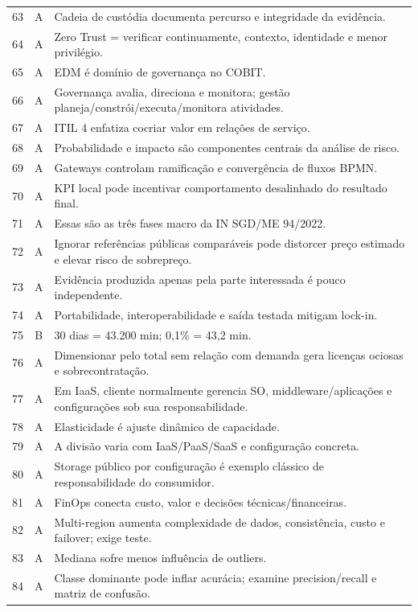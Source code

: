\begin{longtable}{c c p{10.8cm}}
63 & A & Cadeia de custódia documenta percurso e integridade da evidência. \\
64 & A & Zero Trust = verificar continuamente, contexto, identidade e menor privilégio. \\
65 & A & EDM é domínio de governança no COBIT. \\
66 & A & Governança avalia, direciona e monitora; gestão planeja/constrói/executa/monitora atividades. \\
67 & A & ITIL 4 enfatiza cocriar valor em relações de serviço. \\
68 & A & Probabilidade e impacto são componentes centrais da análise de risco. \\
69 & A & Gateways controlam ramificação e convergência de fluxos BPMN. \\
70 & A & KPI local pode incentivar comportamento desalinhado do resultado final. \\
71 & A & Essas são as três fases macro da IN SGD/ME 94/2022. \\
72 & A & Ignorar referências públicas comparáveis pode distorcer preço estimado e elevar risco de sobrepreço. \\
73 & A & Evidência produzida apenas pela parte interessada é pouco independente. \\
74 & A & Portabilidade, interoperabilidade e saída testada mitigam lock-in. \\
75 & B & 30 dias = 43.200 min; 0,1\% = 43,2 min. \\
76 & A & Dimensionar pelo total sem relação com demanda gera licenças ociosas e sobrecontratação. \\
77 & A & Em IaaS, cliente normalmente gerencia SO, middleware/aplicações e configurações sob sua responsabilidade. \\
78 & A & Elasticidade é ajuste dinâmico de capacidade. \\
79 & A & A divisão varia com IaaS/PaaS/SaaS e configuração concreta. \\
80 & A & Storage público por configuração é exemplo clássico de responsabilidade do consumidor. \\
81 & A & FinOps conecta custo, valor e decisões técnicas/financeiras. \\
82 & A & Multi-region aumenta complexidade de dados, consistência, custo e failover; exige teste. \\
83 & A & Mediana sofre menos influência de outliers. \\
84 & A & Classe dominante pode inflar acurácia; examine precision/recall e matriz de confusão. \\

\end{longtable}
